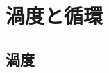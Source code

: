 \documentclass[uplatex,dvipdfmx,a4j,11pt]{jsreport}
\newcommand{\e}{\mathbf{e}} %
\newcommand{\diff}{\mathrm{d}} %
\numberwithin{equation}{chapter}
\begin{document}


\section{渦度と循環}

\subsection{渦度}
\end{document}
